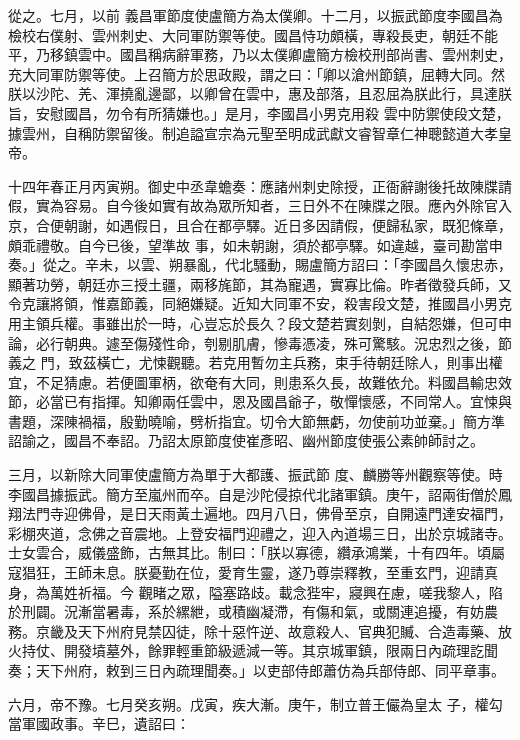\begin{pinyinscope}
 從之。七月，以前
 義昌軍節度使盧簡方為太僕卿。十二月，以振武節度李國昌為檢校右僕射、雲州刺史、大同軍防禦等使。國昌恃功頗橫，專殺長吏，朝廷不能平，乃移鎮雲中。國昌稱病辭軍務，乃以太僕卿盧簡方檢校刑部尚書、雲州刺史，充大同軍防禦等使。上召簡方於思政殿，謂之曰：「卿以滄州節鎮，屈轉大同。然朕以沙陀、羌、渾撓亂邊鄙，以卿曾在雲中，惠及部落，且忍屈為朕此行，具達朕旨，安慰國昌，勿令有所猜嫌也。」是月，李國昌小男克用殺
 雲中防禦使段文楚，據雲州，自稱防禦留後。制追謚宣宗為元聖至明成武獻文睿智章仁神聰懿道大孝皇帝。



 十四年春正月丙寅朔。御史中丞韋蟾奏：應諸州刺史除授，正衙辭謝後托故陳牒請假，實為容易。自今後如實有故為眾所知者，三日外不在陳牒之限。應內外除官入京，合便朝謝，如遇假日，且合在都亭驛。近日多因請假，便歸私家，既犯條章，頗乖禮敬。自今已後，望準故
 事，如未朝謝，須於都亭驛。如違越，臺司勘當申奏。」從之。辛未，以雲、朔暴亂，代北騷動，賜盧簡方詔曰：「李國昌久懷忠赤，顯著功勞，朝廷亦三授土疆，兩移旄節，其為寵遇，實寡比倫。昨者徵發兵師，又令克讓將領，惟嘉節義，同絕嫌疑。近知大同軍不安，殺害段文楚，推國昌小男克用主領兵權。事雖出於一時，心豈忘於長久？段文楚若實刻剝，自結怨嫌，但可申論，必行朝典。遽至傷殘性命，刳剔肌膚，慘毒憑凌，殊可驚駭。況忠烈之後，節義之
 門，致茲橫亡，尤悚觀聽。若克用暫勿主兵務，束手待朝廷除人，則事出權宜，不足猜慮。若便圖軍柄，欲奄有大同，則患系久長，故難依允。料國昌輸忠效節，必當已有指揮。知卿兩任雲中，恩及國昌爺子，敬憚懷感，不同常人。宜悚與書題，深陳禍福，殷勤曉喻，劈析指宜。切令大節無虧，勿使前功並棄。」簡方準詔諭之，國昌不奉詔。乃詔太原節度使崔彥昭、幽州節度使張公素帥師討之。



 三月，以新除大同軍使盧簡方為單于大都護、振武節
 度、麟勝等州觀察等使。時李國昌據振武。簡方至嵐州而卒。自是沙陀侵掠代北諸軍鎮。庚午，詔兩街僧於鳳翔法門寺迎佛骨，是日天雨黃土遍地。四月八日，佛骨至京，自開遠門達安福門，彩棚夾道，念佛之音震地。上登安福門迎禮之，迎入內道場三日，出於京城諸寺。士女雲合，威儀盛飾，古無其比。制曰：「朕以寡德，纘承鴻業，十有四年。頃屬寇猖狂，王師未息。朕憂勤在位，愛育生靈，遂乃尊崇釋教，至重玄門，迎請真身，為萬姓祈福。今
 觀睹之眾，隘塞路歧。載念狴牢，寢興在慮，嗟我黎人，陷於刑闢。況漸當暑毒，系於縲紲，或積幽凝滯，有傷和氣，或關連追擾，有妨農務。京畿及天下州府見禁囚徒，除十惡忤逆、故意殺人、官典犯贓、合造毒藥、放火持仗、開發墳墓外，餘罪輕重節級遞減一等。其京城軍鎮，限兩日內疏理訖聞奏；天下州府，敕到三日內疏理聞奏。」以吏部侍郎蕭仿為兵部侍郎、同平章事。



 六月，帝不豫。七月癸亥朔。戊寅，疾大漸。庚午，制立普王儼為皇太
 子，權勾當軍國政事。辛巳，遺詔曰：




\end{pinyinscope}
